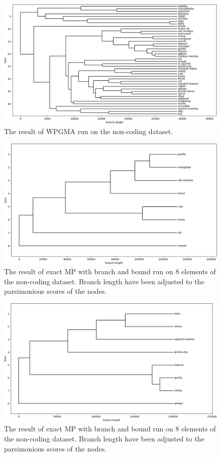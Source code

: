 \documentclass[11pt,twocolumn]{article}
\begin{document}
\begin{figure}
    \centering
    \includegraphics[width=\linewidth]{img/wpgma_noncoding.png}
    \caption{The result of WPGMA run on the non-coding dataset.}
    \label{fig:wpgma_noncoding}
\end{figure}

\begin{figure}
    \centering
    \includegraphics[width=\linewidth]{img/mp_8_taxa_noncoding_1.png}
    \caption{The result of exact MP with branch and bound run on 8 elements of the non-coding dataset. Branch length have been adjusted to the parsimonious scores of the nodes.}
    \label{fig:mp_noncoding_1}
\end{figure}

\begin{figure}
    \centering
    \includegraphics[width=\linewidth]{img/mp_8_taxa_noncoding_2.png}
    \caption{The result of exact MP with branch and bound run on 8 elements of the non-coding dataset. Branch length have been adjusted to the parsimonious scores of the nodes.}
    \label{fig:mp_noncoding_2}
\end{figure}
\end{document}
